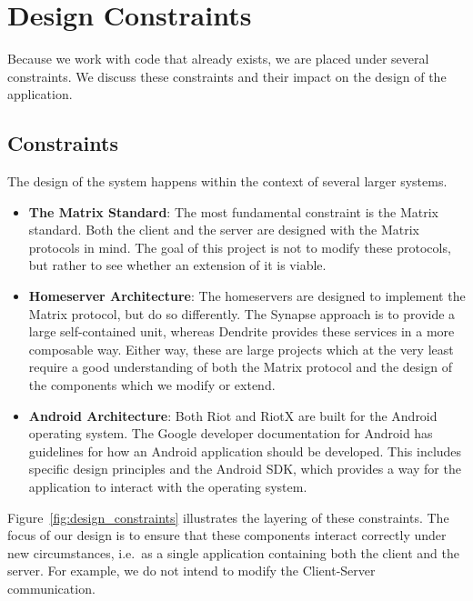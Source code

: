 \chapter{Design Constraints}\label{chp:design}
Because we work with code that already exists, we are placed under several constraints.
We discuss these constraints and their impact on the design of the application.


\section{Constraints}\label{sec:constraints}
The design of the system happens within the context of several larger systems.
\begin{itemize}
	\item{
	      \textbf{The Matrix Standard}:
	      The most fundamental constraint is the Matrix standard.
	      Both the client and the server are designed with the Matrix protocols in mind.
	      The goal of this project is not to modify these protocols, but rather to see whether an extension of it is viable.
	      }
	\item{
	      \textbf{Homeserver Architecture}:
	      The homeservers are designed to implement the Matrix protocol, but do so differently.
	      The Synapse approach is to provide a large self-contained unit, whereas Dendrite provides these services in a more composable way.
	      Either way, these are large projects which at the very least require a good understanding of both the Matrix protocol and the design of the components which we modify or extend.
	      }
	\item{
	      \textbf{Android Architecture}:
	      Both Riot and RiotX are built for the Android operating system.
	      The Google developer documentation for Android has guidelines for how an Android application should be developed.
	      This includes specific design principles and the Android \ac{SDK}, which provides a way for the application to interact with the operating system.
	      }
\end{itemize}

Figure~\ref{fig:design_constraints} illustrates the layering of these constraints.
The focus of our design is to ensure that these components interact correctly under new circumstances, i.e.~as a single application containing both the client and the server.
For example, we do not intend to modify the Client-Server communication.

